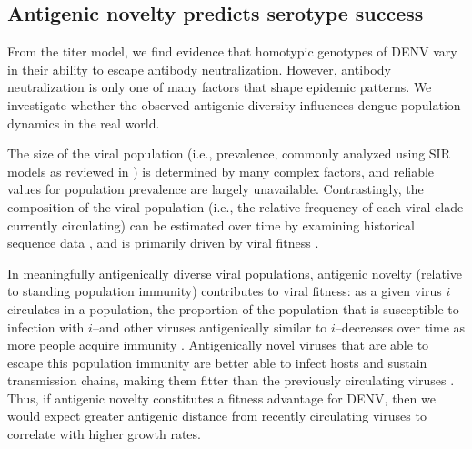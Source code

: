 \documentclass[11pt,oneside,letterpaper]{article}
\begin{document}
\subsection*{Antigenic novelty predicts serotype success}
From the titer model, we find evidence that homotypic genotypes of DENV vary in their ability to escape antibody neutralization.
However, antibody neutralization is only one of many factors that shape epidemic patterns.
We investigate whether the observed antigenic diversity influences dengue population dynamics in the real world.

The size of the viral population (i.e., prevalence, commonly analyzed using SIR models as reviewed in \citet{lourencco2018challenges}) is determined by many complex factors, and reliable values for population prevalence are largely unavailable.
Contrastingly, the composition of the viral population (i.e., the relative frequency of each viral clade currently circulating) can be estimated over time by examining historical sequence data \citep{lee2018deep,neher2016prediction}, and is primarily driven by viral fitness \citep{bedford2011strength}.

In meaningfully antigenically diverse viral populations, antigenic novelty (relative to standing population immunity) contributes to viral fitness: as a given virus $i$ circulates in a population, the proportion of the population that is susceptible to infection with $i$--and other viruses antigenically similar to $i$--decreases over time as more people acquire immunity \citep{bedford2012canalization, luksza2014predictive}.
Antigenically novel viruses that are able to escape this population immunity are better able to infect hosts and sustain transmission chains, making them fitter than the previously circulating viruses \citep{zhang2005clade, bedford2012canalization, gupta1998chaos,wearing2006ecological,lourencco2013natural}.
Thus, if antigenic novelty constitutes a fitness advantage for DENV, then we would expect greater antigenic distance from recently circulating viruses to correlate with higher growth rates.
\end{document}
